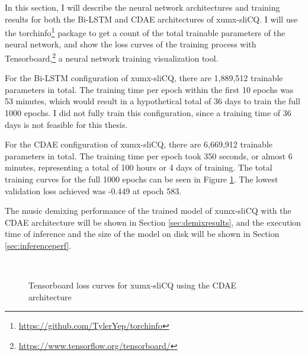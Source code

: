 \documentclass[report.tex]{subfiles}
\begin{document}
In this section, I will describe the neural network architectures and training results for both the Bi-LSTM and CDAE architectures of xumx-sliCQ. I will use the torchinfo\footnote{\url{https://github.com/TylerYep/torchinfo}} package to get a count of the total trainable parameters of the neural network, and show the loss curves of the training process with Tensorboard,\footnote{\url{https://www.tensorflow.org/tensorboard/}} a neural network training visualization tool.

For the Bi-LSTM configuration of xumx-sliCQ, there are 1,889,512 trainable parameters in total. The training time per epoch within the first 10 epochs was 53 minutes, which would result in a hypothetical total of 36 days to train the full 1000 epochs. I did not fully train this configuration, since a training time of 36 days is not feasible for this thesis.

For the CDAE configuration of xumx-sliCQ, there are 6,669,912 trainable parameters in total. The training time per epoch took 350 seconds, or almost 6 minutes, representing a total of 100 hours or 4 days of training. The total training curves for the full 1000 epochs can be seen in Figure \ref{fig:networkloss}. The lowest validation loss achieved was -0.449 at epoch 583.

The music demixing performance of the trained model of xumx-sliCQ with the CDAE architecture will be shown in Section \ref{sec:demixresults}, and the execution time of inference and the size of the model on disk will be shown in Section \ref{sec:inferenceperf}.

\begin{figure}[ht]
	\centering
	\\
	\caption{Tensorboard loss curves for xumx-sliCQ using the CDAE architecture}
	\label{fig:networkloss}
\end{figure}
\end{document}
